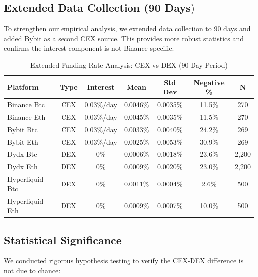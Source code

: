 

\subsection{Extended Data Collection (90 Days)}

To strengthen our empirical analysis, we extended data collection to 90 days and added Bybit as a second CEX source. This provides more robust statistics and confirms the interest component is not Binance-specific.

\begin{table}[h]
\centering
\caption{Extended Funding Rate Analysis: CEX vs DEX (90-Day Period)}
\label{tab:extended_analysis}
\begin{tabular}{@{}lcccccc@{}}
\toprule
\textbf{Platform} & \textbf{Type} & \textbf{Interest} & \textbf{Mean} & \textbf{Std Dev} & \textbf{Negative \%} & \textbf{N} \\
\midrule
    Binance Btc & CEX & 0.03\%/day & 0.0046\% & 0.0035\% & 11.5\% & 270 \\
    Binance Eth & CEX & 0.03\%/day & 0.0045\% & 0.0035\% & 11.5\% & 270 \\
    Bybit Btc & CEX & 0.03\%/day & 0.0033\% & 0.0040\% & 24.2\% & 269 \\
    Bybit Eth & CEX & 0.03\%/day & 0.0025\% & 0.0053\% & 30.9\% & 269 \\
    Dydx Btc & DEX & 0\% & 0.0006\% & 0.0018\% & 23.6\% & 2,200 \\
    Dydx Eth & DEX & 0\% & 0.0009\% & 0.0020\% & 23.0\% & 2,200 \\
    Hyperliquid Btc & DEX & 0\% & 0.0011\% & 0.0004\% & 2.6\% & 500 \\
    Hyperliquid Eth & DEX & 0\% & 0.0009\% & 0.0007\% & 10.0\% & 500 \\
\bottomrule
\end{tabular}
\end{table}

\subsection{Statistical Significance}

We conducted rigorous hypothesis testing to verify the CEX-DEX difference is not due to chance:

